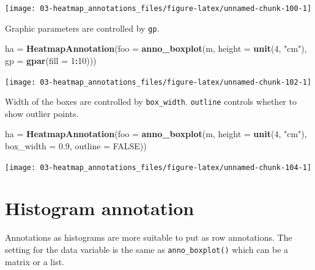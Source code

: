 \documentclass[]{book}
\newenvironment{Shaded}{\begin{snugshade}}{\end{snugshade}}
\newcommand{\KeywordTok}[1]{\textcolor[rgb]{0.13,0.29,0.53}{\textbf{#1}}}
\newcommand{\DataTypeTok}[1]{\textcolor[rgb]{0.13,0.29,0.53}{#1}}
\newcommand{\DecValTok}[1]{\textcolor[rgb]{0.00,0.00,0.81}{#1}}
\newcommand{\FloatTok}[1]{\textcolor[rgb]{0.00,0.00,0.81}{#1}}
\newcommand{\StringTok}[1]{\textcolor[rgb]{0.31,0.60,0.02}{#1}}
\newcommand{\OtherTok}[1]{\textcolor[rgb]{0.56,0.35,0.01}{#1}}
\newcommand{\OperatorTok}[1]{\textcolor[rgb]{0.81,0.36,0.00}{\textbf{#1}}}
\newcommand{\NormalTok}[1]{#1}
\theoremstyle{definition}
\theoremstyle{definition}
\theoremstyle{definition}
\theoremstyle{remark}
\begin{document}
\begin{center}\texttt{[image: 03-heatmap\_annotations\_files/figure-latex/unnamed-chunk-100-1]} \end{center}

Graphic parameters are controlled by \texttt{gp}.

\begin{Shaded}
\begin{Highlighting}[]
\NormalTok{ha =}\StringTok{ }\KeywordTok{HeatmapAnnotation}\NormalTok{(}\DataTypeTok{foo =} \KeywordTok{anno_boxplot}\NormalTok{(m, }\DataTypeTok{height =} \KeywordTok{unit}\NormalTok{(}\DecValTok{4}\NormalTok{, }\StringTok{"cm"}\NormalTok{), }
    \DataTypeTok{gp =} \KeywordTok{gpar}\NormalTok{(}\DataTypeTok{fill =} \DecValTok{1}\OperatorTok{:}\DecValTok{10}\NormalTok{)))}
\end{Highlighting}
\end{Shaded}

\begin{center}\texttt{[image: 03-heatmap\_annotations\_files/figure-latex/unnamed-chunk-102-1]} \end{center}

Width of the boxes are controlled by \texttt{box\_width}.
\texttt{outline} controls whether to show outlier points.

\begin{Shaded}
\begin{Highlighting}[]
\NormalTok{ha =}\StringTok{ }\KeywordTok{HeatmapAnnotation}\NormalTok{(}\DataTypeTok{foo =} \KeywordTok{anno_boxplot}\NormalTok{(m, }\DataTypeTok{height =} \KeywordTok{unit}\NormalTok{(}\DecValTok{4}\NormalTok{, }\StringTok{"cm"}\NormalTok{), }
    \DataTypeTok{box_width =} \FloatTok{0.9}\NormalTok{, }\DataTypeTok{outline =} \OtherTok{FALSE}\NormalTok{))}
\end{Highlighting}
\end{Shaded}

\begin{center}\texttt{[image: 03-heatmap\_annotations\_files/figure-latex/unnamed-chunk-104-1]} \end{center}

\section{Histogram annotation}\label{histogram-annotation}

Annotations as histograms are more suitable to put as row annotations.
The setting for the data variable is the same as
\texttt{anno\_boxplot()} which can be a matrix or a list.
\end{document}
